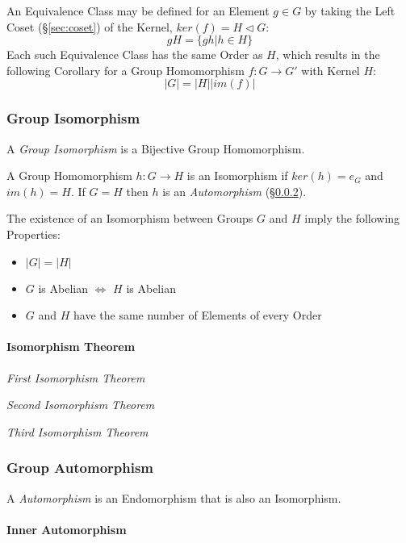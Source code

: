An Equivalence Class may be defined for an Element $g \in G$ by taking
the Left Coset (\S\ref{sec:coset}) of the Kernel, $ker(f) = H
\triangleleft G$:
\[
    gH = \{ gh | h \in H \}
\]
Each such Equivalence Class has the same Order as $H$, which results
in the following Corollary for a Group Homomorphism $f : G \rightarrow
G'$ with Kernel $H$:
\[
    |G| = |H||im(f)|
\]



\subsubsection{Group Isomorphism}\label{sec:group_isomorphism}

A \emph{Group Isomorphism} is a Bijective Group Homomorphism.

A Group Homomorphism $h : G \rightarrow H$ is an Isomorphism if
$ker(h) = e_G$ and $im(h) = H$. If $G = H$ then $h$ is an
\emph{Automorphism} (\S\ref{sec:group_automorphism}).

The existence of an Isomorphism between Groups $G$ and $H$ imply the
following Properties:
\begin{itemize}
    \item $|G| = |H|$
    \item $G$ is Abelian $\Leftrightarrow$ $H$ is Abelian
    \item $G$ and $H$ have the same number of Elements of every Order
\end{itemize}



\paragraph{Isomorphism Theorem}\label{sec:isomorphism_theorem}\hfill

\emph{First Isomorphism Theorem}

\emph{Second Isomorphism Theorem}

\emph{Third Isomorphism Theorem}



\subsubsection{Group Automorphism}\label{sec:group_automorphism}

A \emph{Automorphism} is an Endomorphism that is also an Isomorphism.



\paragraph{Inner Automorphism}\label{sec:inner_automorphism}\hfill

